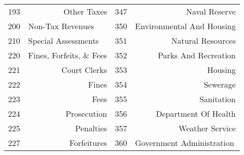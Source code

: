 \begin{tabular}{@{}rr|r|r|@{}}
\multicolumn{1}{|r|}{193}           & Other Taxes                                                        & 347                                & Naval Reserve                                                                      \\
\multicolumn{1}{|l|}{200}           & \multicolumn{1}{l|}{Non-Tax Revenues}                              & \multicolumn{1}{l|}{350}           & \multicolumn{1}{l|}{Environmental And Housing}                                     \\
\multicolumn{1}{|l|}{210}           & \multicolumn{1}{l|}{Special Assessments}                           & 351                                & Natural Resources                                                                  \\
\multicolumn{1}{|l|}{220}           & \multicolumn{1}{l|}{Fines, Forfeits, \& Fees}                      & 352                                & Parks And Recreation                                                               \\
\multicolumn{1}{|r|}{221}           & Court Clerks                                                       & 353                                & Housing                                                                            \\
\multicolumn{1}{|r|}{222}           & Fines                                                              & 354                                & Sewerage                                                                           \\
\multicolumn{1}{|r|}{223}           & Fees                                                               & 355                                & Sanitation                                                                         \\
\multicolumn{1}{|r|}{224}           & Prosecution                                                        & 356                                & Department Of Health                                                               \\
\multicolumn{1}{|r|}{225}           & Penalties                                                          & 357                                & Weather Service                                                                    \\
\multicolumn{1}{|r|}{227}           & Forfeitures                                                        & \multicolumn{1}{l|}{360}           & \multicolumn{1}{l|}{Government Administration}                                     \\

\end{tabular}
